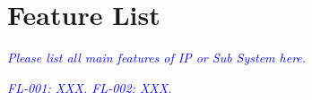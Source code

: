 
\clearpage

\section{Feature List}

\noindent\textit{\small\textcolor{blue}{Please list all main features of IP or Sub System here.\\}}

\noindent\textit{\small\textcolor{blue}{
FL-001: XXX.
\newline
FL-002: XXX.
}}